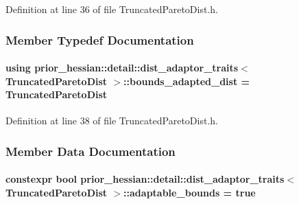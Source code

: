 Definition at line 36 of file Truncated\+Pareto\+Dist.\+h.



\subsubsection{Member Typedef Documentation}
\paragraph[{\texorpdfstring{bounds\+\_\+adapted\+\_\+dist}{bounds_adapted_dist}}]{\setlength{\rightskip}{0pt plus 5cm}using {\bf prior\+\_\+hessian\+::detail\+::dist\+\_\+adaptor\+\_\+traits}$<$ {\bf Truncated\+Pareto\+Dist} $>$\+::{\bf bounds\+\_\+adapted\+\_\+dist} =  {\bf Truncated\+Pareto\+Dist}}\hypertarget{structprior__hessian_1_1detail_1_1dist__adaptor__traits_3_01TruncatedParetoDist_01_4_a7f9f630089f2f3d15823d8115d4dc61b}{}\label{structprior__hessian_1_1detail_1_1dist__adaptor__traits_3_01TruncatedParetoDist_01_4_a7f9f630089f2f3d15823d8115d4dc61b}


Definition at line 38 of file Truncated\+Pareto\+Dist.\+h.



\subsubsection{Member Data Documentation}
\paragraph[{\texorpdfstring{adaptable\+\_\+bounds}{adaptable_bounds}}]{\setlength{\rightskip}{0pt plus 5cm}constexpr bool {\bf prior\+\_\+hessian\+::detail\+::dist\+\_\+adaptor\+\_\+traits}$<$ {\bf Truncated\+Pareto\+Dist} $>$\+::adaptable\+\_\+bounds = true\hspace{0.3cm}{\ttfamily [static]}}\hypertarget{structprior__hessian_1_1detail_1_1dist__adaptor__traits_3_01TruncatedParetoDist_01_4_a79ae0c57937455992ff8394887808474}{}\label{structprior__hessian_1_1detail_1_1dist__adaptor__traits_3_01TruncatedParetoDist_01_4_a79ae0c57937455992ff8394887808474}


